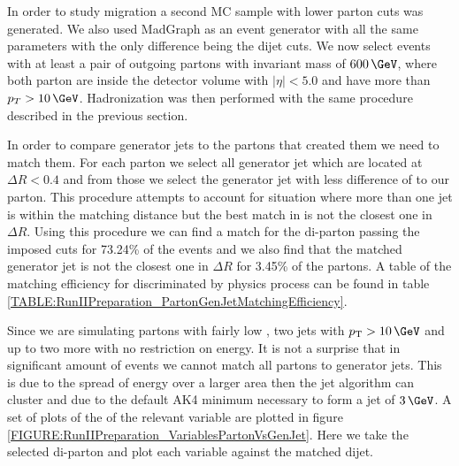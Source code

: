 In order to study migration a second \gls{MC} sample with lower parton cuts was generated. We also used MadGraph as an event generator with all the same parameters with the only difference being the dijet cuts. We now select events with at least a pair of outgoing partons with invariant mass of $600\,\GeV$, where both parton are inside the detector volume with $|\eta|<5.0$ and have more than $p_{T}>10\,\GeV$. Hadronization was then performed with the same procedure described in the previous section.

In order to compare generator jets to the partons that created them we need to match them. For each parton we select all generator jet which are located at $\Delta R < 0.4$ and from those we select the generator jet with less difference of \pt to our parton. This procedure attempts to account for situation where more than one jet is within the matching distance but the best match in \pt is not the closest one in $\Delta R$. Using this procedure we can find a match for the di-parton passing the imposed cuts for 73.24\% of the events and we also find that the matched generator jet is not the closest one in $\Delta R$ for 3.45\% of the partons. A table of the matching efficiency for discriminated by physics process can be found in table \ref{TABLE:RunIIPreparation_PartonGenJetMatchingEfficiency}. 



Since we are simulating partons with fairly low \pt, two jets with $\pt > 10\,\GeV$ and up to two more with no restriction on energy. It is not a surprise that in significant amount of events we cannot match all partons to generator jets. This is due to the spread of energy over a larger area then the jet algorithm can cluster and due to the default AK4 minimum \pt necessary to form a jet of $3\,\GeV$. A set of plots of the of the relevant variable are plotted in figure \ref{FIGURE:RunIIPreparation_VariablesPartonVsGenJet}. Here we take the selected di-parton and plot each variable against the matched dijet.


